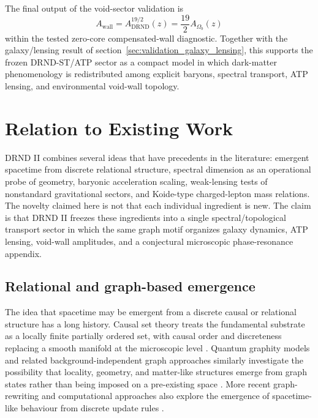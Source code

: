 \documentclass[12pt]{iopart}
\begin{document}
The final output of the void-sector validation is
\begin{equation}
A_{\mathrm{wall}}
=
A_{\mathrm{DRND}}^{19/2}(z)
=
\frac{19}{2}A_{\Omega_b}(z)
\end{equation}
within the tested zero-core compensated-wall diagnostic. Together with the galaxy/lensing result of section~\ref{sec:validation_galaxy_lensing}, this supports the frozen DRND-ST/ATP sector as a compact model in which dark-matter phenomenology is redistributed among explicit baryons, spectral transport, ATP lensing, and environmental void-wall topology.

\section{Relation to Existing Work}
\label{sec:existing_work}

DRND II combines several ideas that have precedents in the literature: emergent spacetime from discrete relational structure, spectral dimension as an operational probe of geometry, baryonic acceleration scaling, weak-lensing tests of nonstandard gravitational sectors, and Koide-type charged-lepton mass relations. The novelty claimed here is not that each individual ingredient is new. The claim is that DRND II freezes these ingredients into a single spectral/topological transport sector in which the same graph motif organizes galaxy dynamics, ATP lensing, void-wall amplitudes, and a conjectural microscopic phase-resonance appendix.

\subsection{Relational and graph-based emergence}

The idea that spacetime may be emergent from a discrete causal or relational structure has a long history. Causal set theory treats the fundamental substrate as a locally finite partially ordered set, with causal order and discreteness replacing a smooth manifold at the microscopic level \cite{Sorkin2003}. Quantum graphity models and related background-independent graph approaches similarly investigate the possibility that locality, geometry, and matter-like structures emerge from graph states rather than being imposed on a pre-existing space \cite{Konopka2008}. More recent graph-rewriting and computational approaches also explore the emergence of spacetime-like behaviour from discrete update rules \cite{Wolfram2020}.
\end{document}
